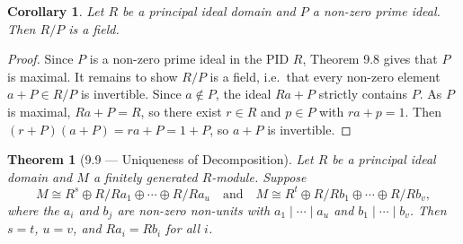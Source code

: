 \documentclass[12pt]{article}
\newtheorem{theorem}{Theorem}
\newtheorem{corollary}{Corollary}
\begin{document}
\begin{corollary}
Let $R$ be a principal ideal domain and $P$ a non-zero prime ideal. Then $R/P$ is a field.
\end{corollary}

\begin{proof}
Since $P$ is a non-zero prime ideal in the PID $R$, Theorem 9.8 gives that $P$ is maximal. It remains to show $R/P$ is a field, i.e.\ that every non-zero element $a + P \in R/P$ is invertible. Since $a \notin P$, the ideal $Ra + P$ strictly contains $P$. As $P$ is maximal, $Ra + P = R$, so there exist $r \in R$ and $p \in P$ with $ra + p = 1$. Then $(r + P)(a + P) = ra + P = 1 + P$, so $a + P$ is invertible.
\end{proof}

\begin{theorem}[9.9 — Uniqueness of Decomposition]
Let $R$ be a principal ideal domain and $M$ a finitely generated $R$-module. Suppose
\[
  M \cong R^s \oplus R/Ra_1 \oplus \cdots \oplus R/Ra_u \quad \text{and} \quad M \cong R^t \oplus R/Rb_1 \oplus \cdots \oplus R/Rb_v,
\]
where the $a_i$ and $b_j$ are non-zero non-units with $a_1 \mid \cdots \mid a_u$ and $b_1 \mid \cdots \mid b_v$. Then $s = t$, $u = v$, and $Ra_i = Rb_i$ for all $i$.
\end{theorem}
\end{document}
